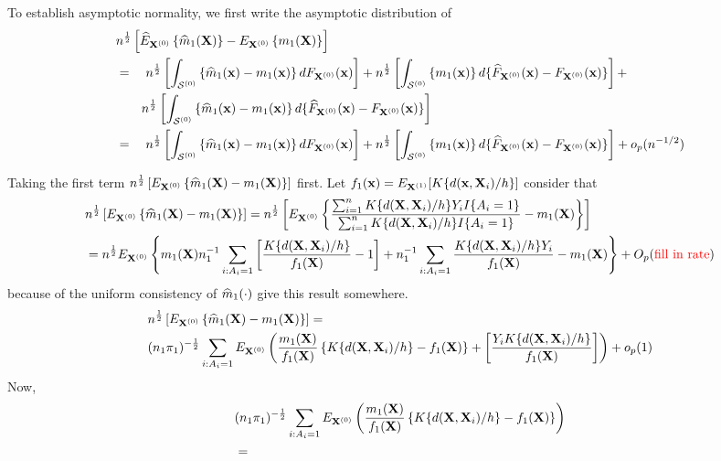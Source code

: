 \documentclass[useAMS,usenatbib,referee]{biom}
\begin{document}
To establish asymptotic normality, we first write the asymptotic distribution of \begin{align*}
    &\nhalf\left[\Ehat_{\bX\szero}\left \{ \mhat_1(\bX)\right \} - E_{\bX\szero}\left \{ m_1(\bX)\right \}\right]\\
     &=\quad \nhalf\left[\int_\suppxz\left \{ \mhat_1(\bx) - m_1(\bx)\right\}dF\subxz(\bx)\right] + 
     \nhalf\left[\int_\suppxz\left \{ m_1(\bx)\right\}d\{\Fhat\subxz(\bx) - F\subxz(\bx)\}\right] +\\
     &\qquad\nhalf\left[\int_\suppxz\left \{\mhat_1(\bx) - m_1(\bx)\right\}d\{\Fhat\subxz(\bx) - F\subxz(\bx)\}\right]\\
     &=\quad \nhalf\left[\int_\suppxz\left \{ \mhat_1(\bx) - m_1(\bx)\right\}dF\subxz(\bx)\right] + 
     \nhalf\left[\int_\suppxz\left \{ m_1(\bx)\right\}d\{\Fhat\subxz(\bx) - F\subxz(\bx)\}\right] + o_p(n^{-1/2})
\end{align*}     

Taking the first term $n^{\frac{1}{2}}\left[E_{{\bf X}^{(0)}}\left \{ {\widehat m}_1({\bf X}) - m_1({\bf X})\right\}\right]$ first. Let $f_1({\bf x}) = E_{{\bf X}^{(1)}}[K\{d({\bf x}, {\bf X}_i)/h\}]$ consider that
\begin{align*}
    &n^{\frac{1}{2}}\left[E_{{\bf X}^{(0)}}\left \{ {\widehat m}_1({\bf X}) - m_1({\bf X})\right\}\right] = n^{\frac{1}{2}} \left[E_{{\bf X}^{(0)}}\left \{ \frac{\sum_{i=1}^n K\{d({\bf X}, {\bf X}_i)/h\}Y_iI\{A_i = 1\}}{\sum_{i=1}^n K\{d({\bf X}, {\bf X}_i)/h\}I\{A_i = 1\}}  - m_1({\bf X})\right\}\right]\\
    &= n^{\frac{1}{2}} E_{{\bf X}^{(0)}}\left \{m_1({\bf X})n_1^{-1}\sum_{i : A_i = 1}\left[\frac{K\{d({\bf X}, {\bf X}_i)/h\}}{f_1({\bf X})} - 1\right] + n_1^{-1}\sum_{i : A_i = 1}\frac{K\{d({\bf X}, {\bf X}_i)/h\}Y_i}{f_1({\bf X})} - m_1({\bf X})
    \right\} + O_p(\text{\color{red} fill in rate})
\end{align*}
because of the uniform consistency of ${\widehat m}_1(\cdot)$ {\color{red} give this result somewhere}. 
\begin{align*}
    &n^{\frac{1}{2}}\left[E_{{\bf X}^{(0)}}\left \{ {\widehat m}_1({\bf X}) - m_1({\bf X})\right\}\right] = \\
    &(n_1\pi_1)^{-\frac{1}{2}}\sum_{i : A_i = 1}E_{{\bf X}^{(0)}}\left(\frac{m_1({\bf X})}{f_1({\bf X})}\left\{K\{d({\bf X}, {\bf X}_i)/h\} - f_1({\bf X})\right\} + \left[\frac{Y_iK\{d({\bf X}, {\bf X}_i)/h\}}{f_1({\bf X})} \right] \right) + o_p(1)
\end{align*}
Now,
\begin{align*}
    &(n_1\pi_1)^{-\frac{1}{2}}\sum_{i : A_i = 1}E_{{\bf X}^{(0)}}\left(\frac{m_1({\bf X})}{f_1({\bf X})}\left\{K\{d({\bf X}, {\bf X}_i)/h\} - f_1({\bf X})\right\}\right)\\
    &= 
\end{align*}
\end{document}
